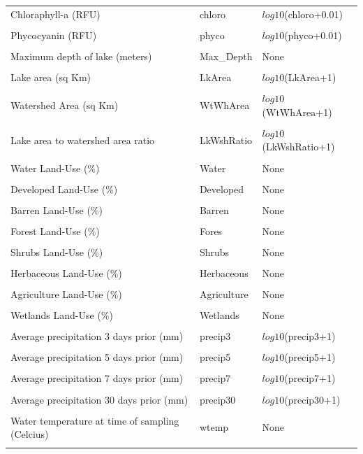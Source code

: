 \begin{longtable}{p{3.5cm}p{1cm}p{3.3cm}}
Chloraphyll-a (RFU) & chloro & $log10$(chloro+0.01) \\ \\
Phycocyanin (RFU) & phyco &  $log10$(phyco+0.01) \\ \\
Maximum depth of lake (meters) &   Max\_Depth &  None \\ \\
Lake area (sq Km) & LkArea & $log10$(LkArea+1) \\ \\
Watershed Area (sq Km) &  WtWhArea & $log10$(WtWhArea+1) \\ \\
Lake area to watershed area ratio & LkWshRatio &  $log10$(LkWshRatio+1) \\ \\
Water Land-Use (\%) & Water &  None \\ \\
Developed Land-Use  (\%) & Developed & None \\ \\
Barren Land-Use (\%) & Barren & None \\ \\
Forest Land-Use (\%) & Fores & None \\ \\
Shrubs Land-Use (\%) & Shrubs & None \\ \\
Herbaceous Land-Use (\%) & Herbaceous  & None \\ \\
Agriculture Land-Use (\%) & Agriculture & None \\ \\
Wetlands Land-Use (\%) & Wetlands & None \\ \\
Average precipitation 3 days prior (mm) & precip3 &  $log10$(precip3+1) \\ \\
Average precipitation 5 days prior (mm)  & precip5 & $log10$(precip5+1) \\ \\
Average precipitation 7 days prior (mm) & precip7 &  $log10$(precip7+1) \\ \\
Average precipitation 30 days prior (mm) & precip30 &  $log10$(precip30+1) \\ \\
Water temperature at time of sampling (Celcius) & wtemp & None \\ \\

\end{longtable}
